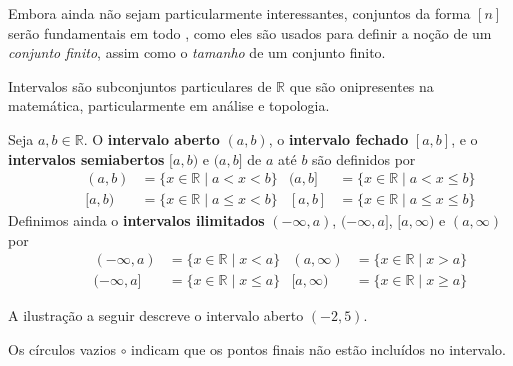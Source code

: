 Embora ainda não sejam particularmente interessantes, conjuntos da forma $[n]$ serão fundamentais em todo , como eles são usados ​​para definir a noção de um \textit{conjunto finito}, assim como o \textit{tamanho} de um conjunto finito.

Intervalos são subconjuntos particulares de $\mathbb{R}$ que são onipresentes na matemática, particularmente em análise e topologia.

\begin{definition}
\label{defIntervals}
\nindex{abint3}{$(a,b]$}{half-open interval}
\nindex{abint4}{$[a,b)$}{half-open interval}
Seja $a,b \in \mathbb{R}$. O \textbf{intervalo aberto} $(a,b)$, o \textbf{intervalo fechado} $[a,b]$, e o \textbf{intervalos semiabertos} $[a,b)$ e $(a,b]$ de $a$ até $b$ são definidos por
\begin{align*}
\hspace{35pt} (a,b) &= \{ x \in \mathbb{R} \mid a < x < b \}
&
(a,b] &= \{ x \in \mathbb{R} \mid a < x \le b \} 
\\
\hspace{35pt} [a,b) &= \{ x \in \mathbb{R} \mid a \le x < b \}
&
[a,b] &= \{ x \in \mathbb{R} \mid a \le x \le b \}
\end{align*}
Definimos ainda o \textbf{intervalos ilimitados} $(-\infty, a)$, $(-\infty, a]$, $[a, \infty)$ e $(a, \infty)$  por
\begin{align*}
\hspace{35pt} (-\infty,a) &= \{ x \in \mathbb{R} \mid x < a \}
&
(a,\infty) &= \{ x \in \mathbb{R} \mid x > a \}
\\
\hspace{35pt} (-\infty, a] &= \{ x \in \mathbb{R} \mid x \le a \} 
&
[a,\infty) &= \{ x \in \mathbb{R} \mid x \ge a \}
\end{align*}
\end{definition}

\begin{example}
A ilustração a seguir descreve o intervalo aberto $(-2,5)$.

\vspace{-10pt}
\begin{center}
\end{center}
Os círculos vazios $\circ$ indicam que os pontos finais não estão incluídos no intervalo.
\end{example}

